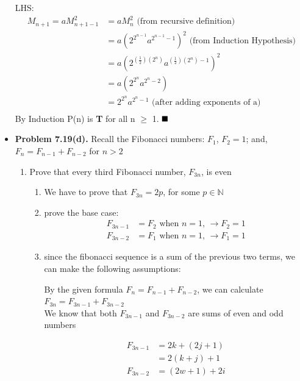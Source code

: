 \documentclass{article}
\begin{document}
\begin{itemize}
	LHS:
	\begin{align*}
	M_{n+1} = aM_{n+1-1}^2 &= aM_{n}^2 \text{ (from recursive definition)}\\
	&= a(2^{2^{n-1}}a^{2^{n-1}-1})^2 \text{ (from Induction Hypothesis)}\\
	&= a(2^{(\frac{1}{2})(2^n)}a^{(\frac{1}{2})(2^n)-1})^2\\
	&= a(2^{2^n}a^{2^n -2})\\
	&= 2^{2^n}a^{2^n-1} \text{ (after adding exponents of a)}\\ 
	\end{align*}
	By Induction P(n) is \textbf{T} for all n $\ge$ 1. $\hfill\blacksquare$
	

               \item \textbf{Problem 7.19(d).} Recall the Fibonacci numbers: $F_1$, $F_2 = 1$; and, $F_n = F_{n-1} + F_{n-2}$ for $n > 2$
        \begin{enumerate}[label=(d)]
            \item Prove that every third Fibonacci number, $F_{3n}$, is even
            \begin{enumerate}[label=(\roman*)]
                \item We have to prove that $F_{3n} = 2p$, for some $p \in \mathbb{N}$
                \item prove the base case:
                \begin{align*}
                    F_{3n-1} &= F_2 \text{ when $n=1$, } \rightarrow F_2 = 1\\
                    F_{3n-2} &= F_1 \text{ when $n=1$, } \rightarrow F_1 = 1
                \end{align*}
                \item since the fibonacci sequence is a sum of the previous two terms, we can make the following assumptions:
                \begin{center}
                    By the given formula $F_n = F_{n-1} + F_{n-2}$, we can calculate $F_{3n} = F_{3n-1} + F_{3n-2}$\\
                    We know that both $F_{3n-1}$ and $F_{3n-2}$ are sums of even and odd numbers
                \end{center}
                \begin{align*}
                    F_{3n-1} &= 2k + (2j + 1)\\
                             &= 2(k + j) + 1\\
                    F_{3n-2} &= (2w + 1) + 2i\\

\end{align*}
\end{enumerate}
\end{enumerate}
\end{itemize}
\end{document}
